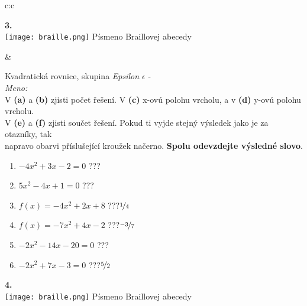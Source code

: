 \documentclass[10pt]{report}
\begin{document}
\begin{tabular}{c:c}
\begin{minipage}[c][99mm][t]{0.49\linewidth}
\begin{center}
\begin{minipage}{0.20\linewidth}
\begin{center}
{\Huge\bfseries 3.} \\[2mm]
\texttt{[image: braille.png]}
{\small Písmeno Braillovej abecedy}
\end{center}
\end{minipage}
\end{center}
\end{minipage}
&
\begin{minipage}[c][99mm][t]{0.49\linewidth}
\begin{center}
\vspace{7mm}
{\huge Kvadratická rovnice, skupina \textit{Epsilon $\epsilon$} -}\\[4.5mm]
\textit{Meno:}\phantom{xxxxxxxxxxxxxxxxxxxxxxxxxxxxxxxxxxxxxxxxxxxxxxxxxxxxxxxxxxxxxxxxx}\\[3.5mm]
V \textbf{(a)} a \textbf{(b)} zjisti počet řešení. V \textbf{(c)} x-ovú polohu vrcholu, a v \textbf{(d)} y-ovú polohu vrcholu.\\V \textbf{(e)} a \textbf{(f)} zjisti součet řešení. Pokud ti vyjde stejný výsledek jako je za otazníky, tak\\napravo obarvi příslušející kroužek načerno. \textbf{Spolu odevzdejte výsledné slovo}.\\[3mm]
\begin{minipage}{0.77\linewidth}
\begin{center}
\begin{varwidth}{\textwidth}
\begin{enumerate}
\large
\item $-4x^2+3x-2=0$\quad \dotfill\; ???\;\dotfill {}
\item $5x^2-4x+1=0$\quad \dotfill\; ???\;\dotfill {}
\item $f(x)=-4x^2+2x+8$\quad \dotfill\; ???\;\dotfill \quad $\nicefrac{1}{4}$
\item $f(x)=-7x^2+4x-2$\quad \dotfill\; ???\;\dotfill \quad $\nicefrac{-3}{7}$
\item $-2x^2-14x-20=0$\quad \dotfill\; ???\;\dotfill {}
\item $-2x^2+7x-3=0$\quad \dotfill\; ???\;\dotfill \quad $\nicefrac{5}{2}$
\end{enumerate}
\end{varwidth}
\end{center}
\end{minipage}
\begin{minipage}{0.20\linewidth}
\begin{center}
{\Huge\bfseries 4.} \\[2mm]
\texttt{[image: braille.png]}
{\small Písmeno Braillovej abecedy}
\end{center}
\end{minipage}
\end{center}
\end{minipage}

\end{tabular}
\end{document}
